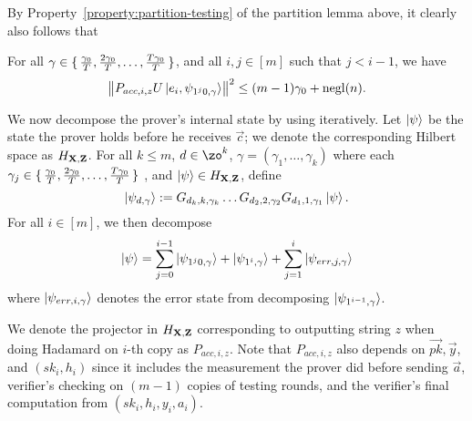 By Property~\ref{property:partition-testing} of the partition lemma above,
it clearly also follows that 
\begin{rmk}
	\label{lem:partition-testing}
	For all $\gamma\in\set{\frac{\gamma_0}{T},\frac{2\gamma_0}{T},\dots,\frac{T\gamma_0}{T}}$, and all $i,j\in[m]$ such that $j<i-1$, we have
	$$\left\lVert P_{acc,i,z} U \ket{e_i, \psi_{1^j0,\gamma}}\right\rVert^2\leq (m-1)\gamma_0+\operatorname{negl}(n).$$
\end{rmk}

We now decompose the prover's internal state by using  iteratively.
Let $\ket{\psi}$ be the state the prover holds before he receives $\vec{c}$;
we denote the corresponding Hilbert space as $H_{\mathbf{X},\mathbf{Z}}$.
For all $k\leq m$, $d\in \zo^k$, $\gamma=(\gamma_1, \ldots, \gamma_k)$ where each $\gamma_j\in\set{\frac{\gamma_0}{T},\frac{2\gamma_0}{T},\dots,\frac{T\gamma_0}{T}}$ , and $\ket{\psi} \in H_{\mathbf{X},\mathbf{Z}}$, define $$\ket{\psi_{d,\gamma}}:= G_{d_k,k,\gamma_k}\ldots G_{d_2,2,\gamma_2} G_{d_1,1,\gamma_1} \ket{\psi}.$$
For all $i\in[m]$, we then decompose
\begin{equation}
	\label{eq:partition-string}
	\ket{\psi}=\sum_{j=0}^{i-1} \ket{\psi_{1^j0,\gamma}} +\ket{\psi_{1^i,\gamma}} +\sum_{j=1}^{i}\ket{\psi_{err,j,\gamma}}
\end{equation}
where $\ket{\psi_{err,i,\gamma}}$ denotes the error state from decomposing $\ket{\psi_{1^{i-1},\gamma}}$.

We denote the projector in $H_{\mathbf{X},\mathbf{Z}}$ corresponding to outputting string $z$ when doing Hadamard on $i$-th copy as $P_{acc,i,z}$.
Note that $P_{acc,i,z}$ also depends on $\vec{pk}, \vec{y}$, and $(sk_i, h_i)$ since it includes the measurement the prover did before sending $\vec{a}$,  verifier's checking on $(m-1)$ copies of testing rounds, and  the verifier's final computation from $(sk_i,h_i,y_i,a_i)$.

